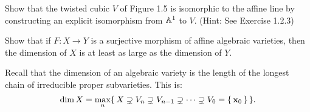 \documentclass[12pt]{memoir}
\begin{document}
\begin{Ej}
  Show that the twisted cubic $V$ of Figure 1.5 is isomorphic to the affine line by constructing an explicit isomorphism from $\mathbb{A}^1$ to $V$. (Hint: See Exercise 1.2.3)
\end{Ej}

\begin{Ej}
 Show that if $F:X\to Y$ is a surjective morphism of affine
 algebraic varieties, then the dimension of $ X $ is at least as large as the dimension of $Y$. 
\end{Ej}

\begin{ptcbr}
  Recall that the dimension of an algebraic variety is the length of the longest chain of irreducible proper subvarieties. This is:
  $$\dim X=\max_{n}\{\,X\supsetneq V_n\supsetneq V_{n-1}\supsetneq\dots\supsetneq V_0=\{\,\mathbf{x}_0\,\}\,\}.$$

\end{ptcbr}
\end{document}
